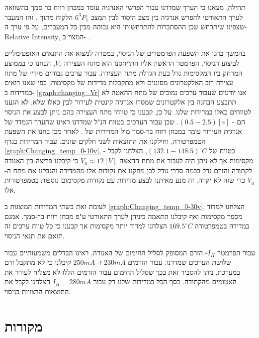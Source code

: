 \documentclass{article}
\begin{document}
תחילה, מצאנו כי הערך שמדדנו עבור הפרשי האנרגיה עומד במבחן רווח בר סמך בהשוואה לערך התאורטי להפרש אנרגיה בין מצב היסוד לבין המצב
$6^3P_1$
הלקוח מתוך
\cite{NIST_ASD}.
זהו המעבר שצפינו שיתרחש שכן ההסתברות להתרחשותו היא גבוהה מבין כל המעברים, על פי ערך
ה-
\textenglish{Relative Intensity},
המצוי ב-
\cite{NIST_ASD}.

בהמשך בחנו את השפעת הפרמטרים של הניסוי, במטרה למצוא את התנאים האופטימליים לביצוע הניסוי.
הפרמטר הראשון אליו התייחסנו הוא מתח העצירה
$V_r$,
הבחנו כי בממוצע המרחק ביו המקסימות גדל בעת הגדלת מתח העצירה.
עבור ערכים גבוהים מידיי של מתח עצירה רוב האלקטרונים מסוננים ולא מתקבלות מדידות של מקסימות, כפי שאנו רואים במדידות ב-
\ref{graph:changing_Vr}
אנו יודעים שעבור ערכים נמוכים של מתח ההאטה לא תתבצע הבחנה בין אלקטרונים שמסרו אנרגיה קינטית לעירור לבין כאלו שלא. לא הגענו לטווחים כאלו במדידות שלנו.
על כן, קבענו כי טווחי מתח העצירה בהם ניתן לבצע את הניסוי הם -
$(0.5 - 2.5)[v]$.
שכן עבור הערכים בטווח הנ"ל שמדדנו ראינו שהערך הנמדד של אנרגית העירור עומד במבחן רווח בר-סמך מול המדידות של
\cite{NIST_ASD}.
לאחר מכן בחנו את השפעת הטמפרטורה, וחילקנו את התוצאות לשני חלקים שונים.
עבור המדידות בגרף
\ref{graph:Changing_temp_0-10v},
- בטווח של
$(132.1 - 148.5)^{\circ}C$,
הצלחנו לקבל מקסימות אך לא ניתן היה לעבור את מתח ההאצה
$V_a \approx 12 [V]$
כי קיבלנו פריצה בין האנודה לקתודה והזרם גדל בכמה סדרי גודל לכן מחקנו את נקודות אלו מהמדידה והגבלנו את מתח ה-
$V_a$
כדי שזה לא יקרה.
זה מנע מאיתנו לבצע מדידות עם נקודות מקסימום נוספות בטמפרטורות אלו.

לעומת זאת בשתי המדידות המוצגות ב
\ref{graph:Changing_temp_0-30v},
הצלחנו למדוד מספר מקסימות ואף קיבלנו התאמה ביניהן לערך התאורטי ע"פ מבחן רווח בר-סמך.
אמנם במדידה בטמפרטורה 
$169.5 ^{\circ}C$
הצלחנו למדוד יותר מקסימות אך קבענו כי כל טווח ערכים זה תואם את תנאי הניסוי.

עבור הפרמטר 
$I_H$-
הזרם המסופק לסליל החימום של האנודה,
ראינו הבדלים משמעותיים עבור שלושת הערכים שמדדנו.
עבור הזרמים
$230 mA$
ו-
$250 mA$
קיבלנו כי לא מתקבל זרם במערכת.
ניתן להסביר זאת בכך שסליל החימום עבור הזרמים הללו לא מצליח לעורר את האטומים מהקתודה.
בסך הכל במדידות שלנו רק עבור
$I_H = 280 mA$
הצלחנו לקבל את התוצאות הרצויות בניסוי.



\section{מקורות}

\begin{english}
\printbibliography[heading=none]
\end{english}
\end{document}
